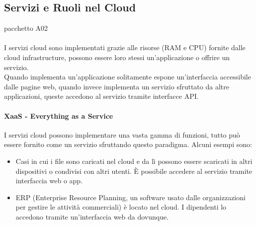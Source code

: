 \documentclass{article}
\begin{document}
\subsection{Servizi e Ruoli nel Cloud}
pacchetto A02\\ \\
I servizi cloud sono implementati grazie alle risorse (RAM e CPU) fornite dalle cloud infrastructure, possono essere loro stessi un’applicazione o offrire un servizio.\\
Quando implementa un’applicazione solitamente espone un’interfaccia accessibile dalle pagine web, quando invece implementa un servizio sfruttato da altre applicazioni, queste accedono al servizio tramite interfacce API.  

\paragraph{XaaS - Everything as a Service}
I servizi cloud possono implementare una vasta gamma di funzioni, tutto può essere fornito come un servizio sfruttando questo paradigma. Alcuni esempi sono:
\begin{itemize}
    \item Casi in cui i file sono caricati nel cloud e da lì possono essere scaricati in altri dispositivi o condivisi con altri utenti. È possibile accedere al servizio tramite interfaccia web o app.
    \item ERP (Enterprise Resource Planning, un software usato dalle organizzazioni per gestire le attività commerciali) è locato nel cloud. I dipendenti lo accedono tramite un’interfaccia web da dovunque.
\end{itemize}
\end{document}

